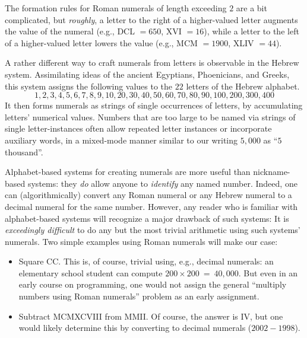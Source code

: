 \smallskip

\noindent
The formation rules for Roman numerals of length exceeding $2$ are a bit complicated, but {\em roughly}, a letter to the right of a higher-valued letter augments the value of the numeral (e.g., DCL $=650$, XVI $=16$), while a letter to the left of a higher-valued letter lowers the value (e.g., MCM $=1900$, XLIV $=44$).

\medskip

A rather different way to craft numerals from letters is observable in the Hebrew system.  Assimilating ideas of the ancient Egyptians, Phoenicians, and Greeks, this system assigns the
following values to the $22$ letters of the Hebrew alphabet.
\[ 1, 2, 3, 4, 5, 6, 7, 8, 9, 10,
20, 30, 40, 50, 60, 70, 80, 90, 100,
 200, 300, 400
\]
It then forms numerals as strings of single occurrences of letters, by accumulating letters' numerical values.  Numbers that are too large to be named via strings of single letter-instances often allow repeated letter instances or incorporate auxiliary words, in a mixed-mode manner similar to our writing $5,000$ as ``$5$ thousand''.

\medskip

Alphabet-based systems for creating numerals are more useful than nickname-based systems: they {\em do} allow anyone to {\em identify} any named number. Indeed, one can (algorithmically) convert any Roman numeral or any Hebrew numeral to a decimal numeral for the same number.  However, any reader who is familiar with alphabet-based systems will recognize a major drawback of such systems: It is {\em exceedingly difficult} to do any but the most trivial arithmetic using such systems' numerals.  Two simple examples using Roman numerals will make our case:
\begin{itemize}
\item
Square CC.  This is, of course, trivial using, e.g., decimal numerals: an elementary school student can compute $200 \times 200 \ = \ 40,000$.  But even in an early course on programming, one would not assign the general ``multiply numbers using Roman numerals'' problem as an early assignment.

\medskip\item
Subtract MCMXCVIII from MMII.  Of course, the answer is IV, but one would likely determine this by converting to decimal numerals ($2002-1998$).
\end{itemize}

\medskip

